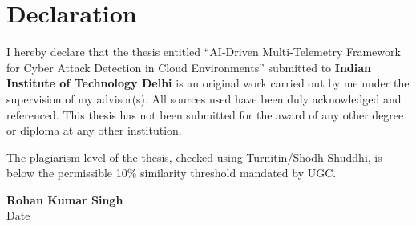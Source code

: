 \chapter*{Declaration}
I hereby declare that the thesis entitled ``AI-Driven Multi-Telemetry Framework for Cyber Attack Detection in Cloud Environments'' submitted to \textbf{Indian Institute of Technology Delhi} is an original work carried out by me under the supervision of my advisor(s). All sources used have been duly acknowledged and referenced. This thesis has not been submitted for the award of any other degree or diploma at any other institution.

The plagiarism level of the thesis, checked using Turnitin/Shodh Shuddhi, is below the permissible 10\% similarity threshold mandated by UGC.

\vspace{1.5cm}
\begin{flushleft}
\textbf{Rohan Kumar Singh}\\[0.3cm]
Date
\end{flushleft}
\cleardoublepage
